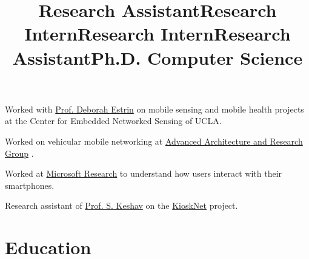\documentclass[margin]{res}
\begin{document}
\begin{resume}
\title{\bf  Research Assistant}
\begin{position}
Worked with {\href{https://en.wikipedia.org/wiki/Deborah_Estrin} {Prof. Deborah Estrin}} on mobile sensing and mobile health projects at the Center for Embedded Networked Sensing of UCLA.
\end{position}

\vspace{-0.15cm}

\title{\bf  Research Intern}
\begin{position}
Worked on vehicular mobile networking at {\href{http://www.cisco.com/web/about/ac50/ac207/crc_new/index.html} {Advanced Architecture and Research Group}}
.
\end{position}

\vspace{-0.15cm}

\title{\bf  Research Intern}
\begin{position}
Worked at {\href{http://research.microsoft.com/en-us/groups/nrg/} {Microsoft Research}}
to understand how users interact with their smartphones.
\end{position}

\vspace{-0.15cm}

\title{\bf  Research Assistant}
\begin{position}
Research assistant of {\href{https://en.wikipedia.org/wiki/Srinivasan_Keshav} {Prof. S. Keshav}} on the  {\href{https://en.wikipedia.org/wiki/KioskNet} {KioskNet}} project.
\end{position}


\title{\bf Ph.D. Computer Science}
\employer{}
\section{\sc \large Education}
\begin{position}
\end{position}


\end{resume}
\end{document}
